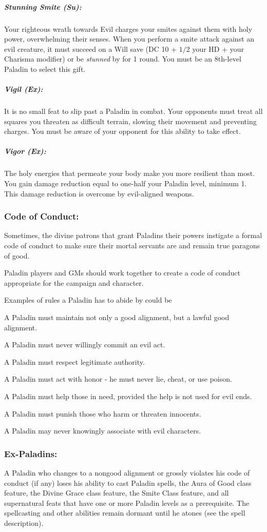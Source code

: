 \subparagraph{Stunning Smite (Su):}
Your righteous wrath towards Evil charges your smites against them with holy power, overwhelming their senses.
When you perform a smite attack against an evil creature, it must succeed on a Will save (DC 10 + $1/2$ your HD + your Charisma modifier) or be \emph{stunned} by for 1 round. You must be an 8th-level Paladin to select this gift.

\subparagraph{Vigil (Ex):}
It is no small feat to slip past a Paladin in combat. Your opponents must treat all squares you threaten as difficult terrain, slowing their movement and preventing charges. You must be aware of your opponent for this ability to take effect.

\subparagraph{Vigor (Ex):}
The holy energies that permeate your body make you more resilient than most. You gain damage reduction equal to one-half your Paladin level, minimum 1. This damage reduction is overcome by evil-aligned weapons.

\subsubsection{Code of Conduct:}
Sometimes, the divine patrons that grant Paladins their powers instigate a formal code of conduct to make sure their mortal servants are and remain true paragons of good.

Paladin players and GMs should work together to create a code of conduct appropriate for the campaign and character.

Examples of rules a Paladin has to abide by could be
\begin{list}{}{\leftmargin=1em}
 \item A Paladin must maintain not only a good alignment, but a lawful good alignment.
 \item A Paladin must never willingly commit an evil act.
 \item A Paladin must respect legitimate authority.
 \item A Paladin must act with honor - he must never lie, cheat, or use poison.
 \item A Paladin must help those in need, provided the help is not used for evil ends.
 \item A Paladin must punish those who harm or threaten innocents.
 \item A Paladin may never knowingly associate with evil characters.
\end{list}
\subsubsection{Ex-Paladins:}
A Paladin who changes to a nongood alignment or grossly violates his code of conduct (if any) loses his ability to cast Paladin spells, the Aura of Good class feature, the Divine Grace class feature, the Smite Class feature, and all supernatural feats that have one or more Paladin levels as a prerequisite.
The spellcasting and other abilities remain dormant until he atones (see the  spell description).

